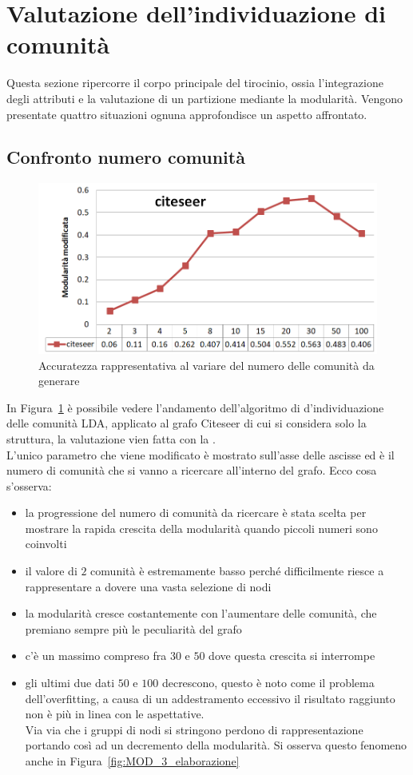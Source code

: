 \section{Valutazione dell'individuazione di comunità}
Questa sezione ripercorre il corpo principale del tirocinio, ossia l'integrazione degli attributi e la valutazione di un partizione mediante la modularità. Vengono presentate quattro situazioni ognuna approfondisce un aspetto affrontato.
%
\subsection{Confronto numero comunità}%
%
\begin{figure}[htp]
	\centering
	\includegraphics[width=\linewidth]{immagini/MOD_1_num_cmty}
	\caption{Accuratezza rappresentativa al variare del numero delle comunità da generare}
	\label{fig:MOD_1_num_cmty}
\end{figure}
%
In Figura~\ref{fig:MOD_1_num_cmty} è possibile vedere l'andamento dell'algoritmo di d'individuazione delle comunità LDA, applicato al grafo Citeseer di cui si considera solo la struttura, la valutazione vien fatta con la \mmod.\\
L'unico parametro che viene modificato è mostrato sull'asse delle ascisse ed è il numero di comunità che si vanno a ricercare all'interno del grafo. Ecco cosa s'osserva:
\begin{itemize}
	\item la progressione del numero di comunità da ricercare è stata scelta per mostrare la rapida crescita della modularità quando piccoli numeri sono coinvolti
	\item il valore di $2$ comunità è estremamente basso perché difficilmente riesce a rappresentare a dovere una vasta selezione di nodi
	\item la modularità cresce costantemente con l'aumentare delle comunità, che premiano sempre più le peculiarità del grafo
	\item c'è un massimo compreso fra $30$ e $50$ dove questa crescita si interrompe
	\item gli ultimi due dati $50$ e $100$ decrescono, questo è noto come il problema dell'overfitting, a causa di un addestramento eccessivo il risultato raggiunto non è più in linea con le aspettative.\\
	Via via che i gruppi di nodi si stringono perdono di rappresentazione portando così ad un decremento della modularità. Si osserva questo fenomeno anche in Figura~\ref{fig:MOD_3_elaborazione}
\end{itemize}

